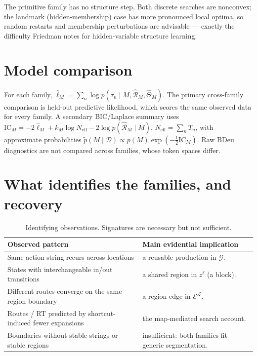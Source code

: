 \documentclass[10pt]{article}
\begin{document}
The primitive family has no structure step. Both discrete searches are nonconvex; the
landmark (hidden-membership) case has more pronounced local optima, so random restarts and
membership perturbations are advisable --- exactly the difficulty Friedman notes for
hidden-variable structure learning.

\section{Model comparison}

For each family, $\widehat\ell_M=\sum_n\log p(\tau_n\mid M,\widehat{\mathcal R}_M,\widehat\Theta_M)$.
The primary cross-family comparison is held-out predictive likelihood, which scores the same
observed data for every family. A secondary BIC/Laplace summary uses
$\mathrm{IC}_M=-2\widehat\ell_M+k_M\log N_{\mathrm{eff}}-2\log p(\widehat{\mathcal R}_M\mid M)$,
$N_{\mathrm{eff}}=\sum_n T_n$, with approximate probabilities
$\widetilde p(M\mid\mathcal D)\propto p(M)\exp(-\tfrac12\mathrm{IC}_M)$. Raw BDeu diagnostics
are not compared across families, whose token spaces differ.

\section{What identifies the families, and recovery}

\begin{table}[H]
\centering
\small
\begin{tabularx}{\textwidth}{lY}
\toprule
Observed pattern & Main evidential implication \\
\midrule
Same action string recurs across locations & a reusable production in $\mathcal G$. \\
States with interchangeable in/out transitions & a shared region in $z^{\ell}$ (a block). \\
Different routes converge on the same region boundary & a region edge in $\mathcal E^{\mathcal L}$. \\
Routes / RT predicted by shortcut-induced fewer expansions & the map-mediated search account. \\
Boundaries without stable strings or stable regions & insufficient: both families fit generic segmentation. \\
\bottomrule
\end{tabularx}
\caption{Identifying observations. Signatures are necessary but not sufficient.}
\label{tab:identification}
\end{table}
\end{document}
